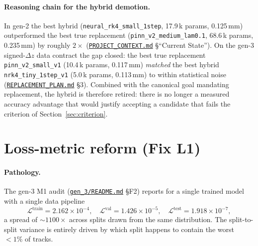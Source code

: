 \documentclass[11pt,a4paper]{article}
\newcommand{\dz}{\Delta z}
\newcommand{\loss}{\mathcal{L}}
\begin{document}
\paragraph{Reasoning chain for the hybrid demotion.} In gen-2 the best
hybrid (\texttt{neural\_rk4\_small\_1step}, 17.9\,k params, 0.125\,mm)
outperformed the best true replacement
(\texttt{pinn\_v2\_medium\_lam0.1}, 68.6\,k params, 0.235\,mm)
by roughly $2\times$
(\href{run:../../PROJECT_CONTEXT.md}{\texttt{PROJECT\_CONTEXT.md}} §``Current
State''). On the gen-3 signed-$\dz$ data contract the gap closed: the best
true replacement \texttt{pinn\_v2\_small\_v1} (10.4\,k params, 0.117\,mm)
\emph{matched} the best hybrid \texttt{nrk4\_tiny\_1step\_v1} (5.0\,k params,
0.113\,mm) to within statistical noise
(\href{run:../../experiments/gen_3/REPLACEMENT_PLAN.md}{\texttt{REPLACEMENT\_PLAN.md}}
§3). Combined with the canonical goal mandating replacement, the hybrid is
therefore retired: there is no longer a measured accuracy advantage that would
justify accepting a candidate that fails the criterion of
Section~\ref{sec:criterion}.

\section{Loss-metric reform (Fix L1)}\label{sec:L1}

\paragraph{Pathology.} The gen-3 M1 audit
(\href{run:../../experiments/gen_3/README.md}{\texttt{gen\_3/README.md}} §F2)
reports for a single trained model with a single data pipeline
\begin{equation}\label{eq:f2}
\loss^\mathrm{train} = 2.162\times 10^{-4},\quad
\loss^\mathrm{val}   = 1.426\times 10^{-5},\quad
\loss^\mathrm{test}  = 1.918\times 10^{-7},
\end{equation}
a spread of $\sim 1100\times$ across splits drawn from the same distribution.
The split-to-split variance is entirely driven by which split happens to
contain the worst $<\!1\%$ of tracks.
\end{document}
